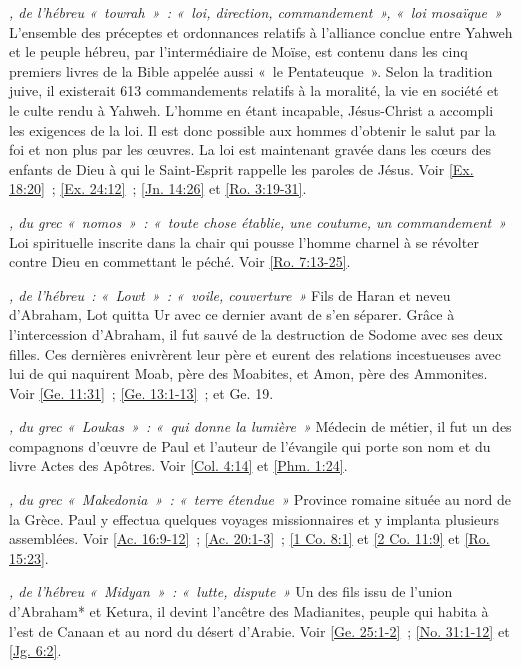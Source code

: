 \begin{multicols}{2}
\textit{, de l'hébreu «~towrah~»~: «~loi, direction, commandement~», «~loi mosaïque~»}\newline
L'ensemble des préceptes et ordonnances relatifs à l'alliance conclue entre Yahweh et le peuple hébreu, par l'intermédiaire de Moïse, est contenu dans les cinq premiers livres de la Bible appelée aussi «~le Pentateuque~». Selon la tradition juive, il existerait 613 commandements relatifs à la moralité, la vie en société et le culte rendu à Yahweh. L'homme en étant incapable, Jésus-Christ a accompli les exigences de la loi. Il est donc possible aux hommes d'obtenir le salut par la foi et non plus par les œuvres. La loi est maintenant gravée dans les cœurs des enfants de Dieu à qui le Saint-Esprit rappelle les paroles de Jésus. Voir \vref{Ex. 18:20}~; \vref{Ex. 24:12}~; \vref{Jn. 14:26} et \vref{Ro. 3:19-31}.

\textit{, du grec «~nomos~»~: «~toute chose établie, une coutume, un commandement~»}\newline
Loi spirituelle inscrite dans la chair qui pousse l'homme charnel à se révolter contre Dieu en commettant le péché. Voir \vref{Ro. 7:13-25}.

\textit{, de l'hébreu~: «~Lowt~»~: «~voile, couverture~»}\newline
Fils de Haran et neveu d'Abraham, Lot quitta Ur avec ce dernier avant de s'en séparer. Grâce à l'intercession d'Abraham, il fut sauvé de la destruction de Sodome avec ses deux filles. Ces dernières enivrèrent leur père et eurent des relations incestueuses avec lui de qui naquirent Moab, père des Moabites, et Amon, père des Ammonites. Voir \vref{Ge. 11:31}~; \vref{Ge. 13:1-13}~; et Ge. 19.

\textit{, du grec «~Loukas~»~: «~qui donne la lumière~»}\newline
Médecin de métier, il fut un des compagnons d'œuvre de Paul et l'auteur de l'évangile qui porte son nom et du livre Actes des Apôtres. Voir \vref{Col. 4:14} et \vref{Phm. 1:24}.

\textit{, du grec «~Makedonia~»~: «~terre étendue~»}\newline
Province romaine située au nord de la Grèce. Paul y effectua quelques voyages missionnaires et y implanta plusieurs assemblées. Voir \vref{Ac. 16:9-12}~; \vref{Ac. 20:1-3}~; \vref{1 Co. 8:1} et \vref{2 Co. 11:9} et \vref{Ro. 15:23}.

\textit{, de l'hébreu «~Midyan~»~: «~lutte, dispute~»}\newline
Un des fils issu de l'union d'Abraham* et Ketura, il devint l'ancêtre des Madianites, peuple qui habita à l'est de Canaan et au nord du désert d'Arabie. Voir \vref{Ge. 25:1-2}~; \vref{No. 31:1-12} et \vref{Jg. 6:2}.


\end{multicols}
